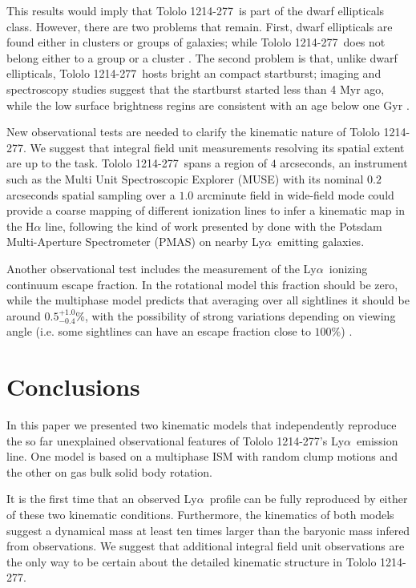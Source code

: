 \documentclass[a4,useAMS,usenatbib,usegraphicx]{mn2e}
\newcommand{\tol}{Tololo 1214-277}
\newcommand{\lya}{Ly$\alpha$}
\begin{document}
This results would imply that \tol\ is part of the dwarf ellipticals
class. However, there are two problems that remain. First, dwarf
ellipticals are found either in clusters or groups of galaxies; while
\tol\ does not belong either to a group or a cluster
\citep{2001AJ....121..169F,}. The second problem is that, unlike dwarf
ellipticals, \tol\ hosts bright an compact startburst; imaging and
spectroscopy studies suggest that the startburst started less than 4
Myr ago, while the low surface brightness regins are consistent with
an age below one Gyr \citep{2001AJ....121..169F}.

New observational tests are needed to clarify the kinematic nature of
\tol. 
We suggest that integral field unit measurements 
resolving its spatial extent are up to the task. 
\tol\ spans a region of $4$ arcseconds,
an instrument such as the Multi Unit Spectroscopic Explorer (MUSE)
\citep{2014Msngr.157...13B} with its
nominal $0.2$ arcseconds spatial sampling over a $1.0$ arcminute field
in wide-field mode could provide a coarse mapping of different
ionization lines to infer a kinematic map in the H$\alpha$ line,
following the kind of work presented by \citet{Herenz16} done with the Potsdam
Multi-Aperture Spectrometer (PMAS) \citet{PMAS} on nearby
\lya\ emitting galaxies.

Another observational test includes the measurement of the
\lya\ ionizing continuum escape fraction.
In the rotational model this fraction should be zero, while
the multiphase model predicts that averaging over all sightlines
it should be around $0.5^{+1.0}_{-0.4}$\%, with the possibility of strong
variations depending on viewing angle (i.e. some sightlines can have
an escape fraction close to $100\%$)\citep{Gronke2016} . 



\section{Conclusions}
\label{sec:conclusions}

In this paper we presented two kinematic models that independently
reproduce the so far unexplained observational features of \tol's
\lya\ emission line.  One model is based on a multiphase ISM with
random clump motions and the other on gas bulk solid body rotation.

It is the first time that an observed \lya\ profile can be fully
reproduced by either of these two kinematic conditions.
Furthermore, the kinematics of both models suggest a dynamical mass
at least ten times larger than the baryonic mass infered from observations.
We suggest that additional integral field unit observations are the
only way to be certain about the detailed kinematic structure in \tol.
\end{document}
